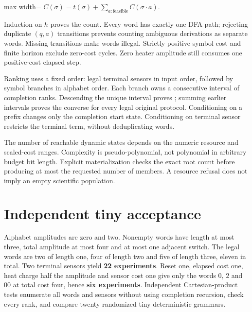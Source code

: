 \documentclass[
  11pt,
  a4paper,
]{report}
\let\singularitytexttt\texttt
\renewcommand{\texttt}[1]{\singularitytexttt{\seqsplit{#1}}}
\begin{document}
\begin{center}
\begin{adjustbox}{max width=\linewidth}
$\displaystyle
C(\sigma)=t(\sigma)+\sum_{a:\text{feasible}}C(\sigma\cdot a).
$
\end{adjustbox}
\end{center}

Induction on \(h\) proves the count. Every word has exactly one DFA
path; rejecting duplicate \((q,a)\) transitions prevents counting
ambiguous derivations as separate words. Missing transitions make words
illegal. Strictly positive symbol cost and finite horizon exclude
zero-cost cycles. Zero heater amplitude still consumes one positive-cost
elapsed step.

Ranking uses a fixed order: legal terminal sensors in input order,
followed by symbol branches in alphabet order. Each branch owns a
consecutive interval of completion ranks. Descending the unique interval
proves \texttt{rank(unrank(i))=i}; summing earlier intervals proves the
converse for every legal original protocol. Conditioning on a prefix
changes only the completion start state. Conditioning on terminal sensor
restricts the terminal term, without deduplicating words.

The number of reachable dynamic states depends on the numeric resource
and scaled-cost ranges. Complexity is pseudo-polynomial, not polynomial
in arbitrary budget bit length. Explicit materialization checks the
exact root count before producing at most the requested number of
members. A resource refusal does not imply an empty scientific
population.

\hypertarget{independent-tiny-acceptance}{%
\section{Independent tiny
acceptance}\label{independent-tiny-acceptance}}

Alphabet amplitudes are zero and two. Nonempty words have length at most
three, total amplitude at most four and at most one adjacent switch. The
legal words are two of length one, four of length two and five of length
three, eleven in total. Two terminal sensors yield \textbf{22
experiments}. Reset one, elapsed cost one, heat charge half the
amplitude and sensor cost one give only the words 0, 2 and 00 at total
cost four, hence \textbf{six experiments}. Independent Cartesian-product
tests enumerate all words and sensors without using completion
recursion, check every rank, and compare twenty randomized tiny
deterministic grammars.
\end{document}
